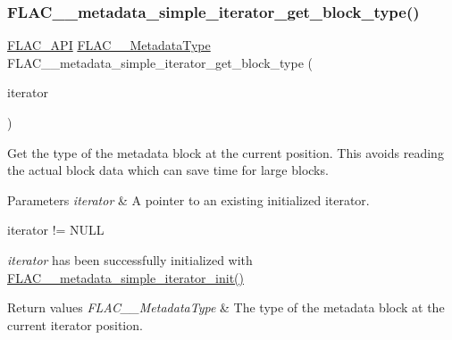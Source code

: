 \subsubsection{\texorpdfstring{F\+L\+A\+C\+\_\+\+\_\+metadata\+\_\+simple\+\_\+iterator\+\_\+get\+\_\+block\+\_\+type()}{FLAC\_\_metadata\_simple\_iterator\_get\_block\_type()}}
{\footnotesize\ttfamily \hyperlink{group__flac__export_ga56ca07df8a23310707732b1c0007d6f5}{F\+L\+A\+C\+\_\+\+A\+PI} \hyperlink{group__flac__format_gac71714ba8ddbbd66d26bb78a427fac01}{F\+L\+A\+C\+\_\+\+\_\+\+Metadata\+Type} F\+L\+A\+C\+\_\+\+\_\+metadata\+\_\+simple\+\_\+iterator\+\_\+get\+\_\+block\+\_\+type (\begin{DoxyParamCaption}\item[{\hyperlink{zconf_8h_a2c212835823e3c54a8ab6d95c652660e}{const} \hyperlink{group__flac__metadata__level1_ga6accccddbb867dfc2eece9ee3ffecb3a}{F\+L\+A\+C\+\_\+\+\_\+\+Metadata\+\_\+\+Simple\+Iterator} $\ast$}]{iterator }\end{DoxyParamCaption})}

Get the type of the metadata block at the current position. This avoids reading the actual block data which can save time for large blocks.


\begin{DoxyParams}{Parameters}
{\em iterator} & A pointer to an existing initialized iterator.  
\begin{DoxyCode}
iterator != NULL 
\end{DoxyCode}
 {\itshape iterator} has been successfully initialized with \hyperlink{group__flac__metadata__level1_ga2a055cca4e6e06ae62517c8b0fa6e8a3}{F\+L\+A\+C\+\_\+\+\_\+metadata\+\_\+simple\+\_\+iterator\+\_\+init()} \\
\hline
\end{DoxyParams}

\begin{DoxyRetVals}{Return values}
{\em F\+L\+A\+C\+\_\+\+\_\+\+Metadata\+Type} & The type of the metadata block at the current iterator position. \\
\hline
\end{DoxyRetVals}
\mbox{\label{group__flac__metadata__level1_ga2a055cca4e6e06ae62517c8b0fa6e8a3}} 
